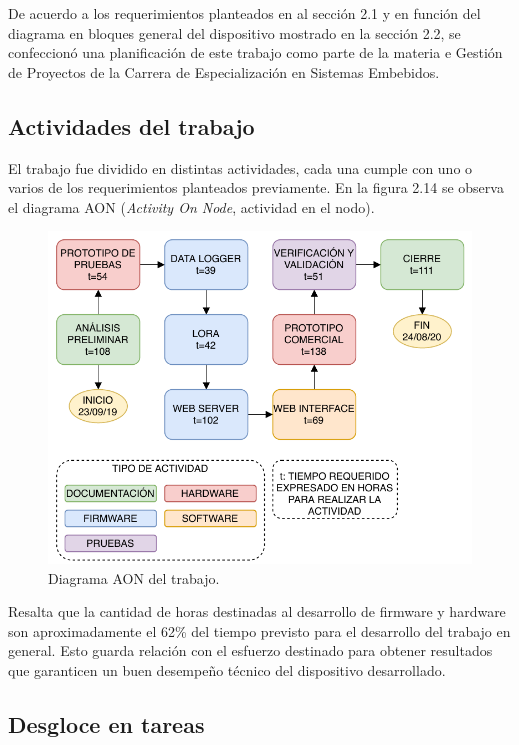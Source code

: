 De acuerdo a los requerimientos planteados en al sección 2.1 y en función del diagrama en bloques general del dispositivo mostrado en la sección 2.2, se confeccionó una planificación de este trabajo como parte de la materia e Gestión de Proyectos de la Carrera de Especialización en Sistemas Embebidos.

\subsection{Actividades del trabajo}

El trabajo fue dividido en distintas actividades, cada una cumple con uno o varios de los requerimientos planteados previamente. En la figura 2.14 se observa el diagrama AON (\textit{Activity On Node}, actividad en el nodo).

\begin{figure}[h]
	\centering
	\includegraphics[scale=1]{./Figures/aon.pdf}
	\caption{Diagrama AON del trabajo.}
	\label{fig:diagramAON}
\end{figure}

Resalta que la cantidad de horas destinadas al desarrollo de firmware y hardware son aproximadamente el 62\% del tiempo previsto para el desarrollo del trabajo en general. Esto guarda relación con el esfuerzo destinado para obtener resultados que garanticen un buen desempeño técnico del dispositivo desarrollado.

\subsection{Desgloce en tareas}

